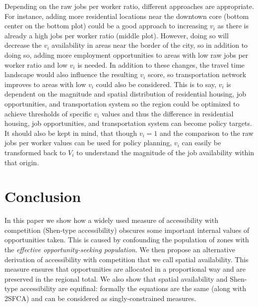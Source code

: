 \documentclass[10pt,letterpaper]{article}
\begin{document}
Depending on the raw jobs per worker ratio, different approaches are
appropriate. For instance, adding more residential locations near the
downtown core (bottom center on the bottom plot) could be a good
approach to increasing \(v_i\) as there is already a high jobs per
worker ratio (middle plot). However, doing so will decrease the \(v_i\)
availability in areas near the border of the city, so in addition to
doing so, adding more employment opportunities to areas with low raw
jobs per worker ratio and low \(v_i\) is needed. In addition to these
changes, the travel time landscape would also influence the resulting
\(v_i\) score, so transportation network improves to areas with low
\(v_i\) could also be considered. This is to say, \(v_i\) is dependent
on the magnitude and spatial distribution of residential housing, job
opportunities, and transportation system so the region could be
optimized to achieve thresholds of specific \(v_i\) values and thus the
difference in residential housing, job opportunities, and transportation
system can become policy targets. It should also be kept in mind, that
though \(v_i = 1\) and the comparison to the raw jobs per worker values
can be used for policy planning, \(v_i\) can easily be transformed back
to \(V_i\) to understand the magnitude of the job availability within
that origin.

\newpage

\hypertarget{conclusion}{%
\section{Conclusion}\label{conclusion}}

In this paper we show how a widely used measure of accessibility with
competition (Shen-type accessibility) obscures some important internal
values of opportunities taken. This is caused by confounding the
population of zones with the \emph{effective opportunity-seeking
population}. We then propose an alternative derivation of accessibility
with competition that we call spatial availability. This measure ensures
that opportunities are allocated in a proportional way and are preserved
in the regional total. We also show that spatial availability and
Shen-type accessibility are equifinal: formally the equations are the
same (along with 2SFCA) and can be considered as singly-constrained
measures.
\end{document}
